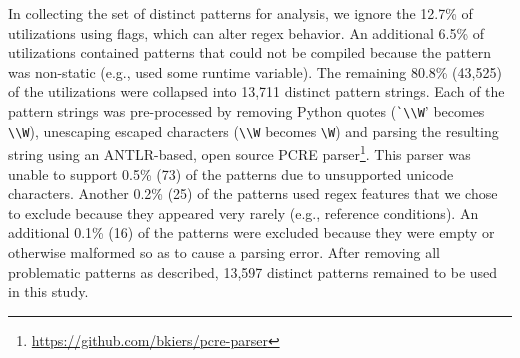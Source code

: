 In collecting the set of distinct patterns for analysis,  we ignore the 12.7\%  of utilizations using flags, which can alter regex behavior.  An additional 6.5\% of utilizations contained patterns that could not be compiled because the pattern was non-static (e.g., used some runtime variable).
The remaining 80.8\% (43,525) of the utilizations were collapsed into 13,711 distinct pattern strings.  Each of the pattern strings was pre-processed by removing Python quotes (\verb!`\\W!' becomes \verb!\\W!), unescaping escaped characters (\verb!\\W! becomes \verb!\W!) and parsing the resulting  string using an ANTLR-based, open source PCRE parser\footnote{\url{https://github.com/bkiers/pcre-parser}}.
This parser was unable to support 0.5\% (73) of the patterns due to unsupported unicode characters.  Another 0.2\% (25) of the patterns used regex features that we  chose to exclude because they appeared very rarely (e.g., reference conditions).  An additional 0.1\% (16) of the patterns were excluded because they were empty or otherwise malformed so as to cause a parsing error.  After removing all problematic patterns as described, 13,597 distinct patterns remained to be used in this study.


